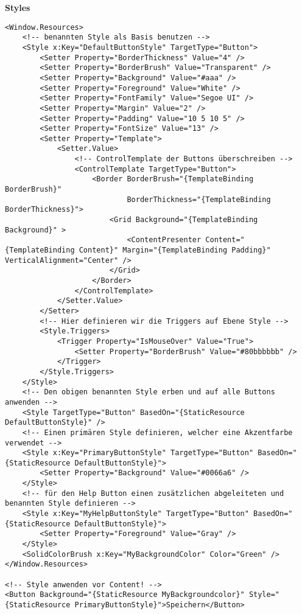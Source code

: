 \textbf{Styles}
\begin{lstlisting}
<Window.Resources>
	<!-- benannten Style als Basis benutzen -->
	<Style x:Key="DefaultButtonStyle" TargetType="Button">
		<Setter Property="BorderThickness" Value="4" />
		<Setter Property="BorderBrush" Value="Transparent" />
		<Setter Property="Background" Value="#aaa" />
		<Setter Property="Foreground" Value="White" />
		<Setter Property="FontFamily" Value="Segoe UI" />
		<Setter Property="Margin" Value="2" />
		<Setter Property="Padding" Value="10 5 10 5" />
		<Setter Property="FontSize" Value="13" />
		<Setter Property="Template">
			<Setter.Value>
				<!-- ControlTemplate der Buttons überschreiben -->
				<ControlTemplate TargetType="Button">
					<Border BorderBrush="{TemplateBinding BorderBrush}" 
							BorderThickness="{TemplateBinding BorderThickness}">
						<Grid Background="{TemplateBinding Background}" >
							<ContentPresenter Content="{TemplateBinding Content}" Margin="{TemplateBinding Padding}" VerticalAlignment="Center" />
						</Grid>
					</Border>
				</ControlTemplate>
			</Setter.Value>
		</Setter>
		<!-- Hier definieren wir die Triggers auf Ebene Style -->
		<Style.Triggers>
			<Trigger Property="IsMouseOver" Value="True">
				<Setter Property="BorderBrush" Value="#80bbbbbb" />
			</Trigger>
		</Style.Triggers>
	</Style>
	<!-- Den obigen benannten Style erben und auf alle Buttons anwenden -->
	<Style TargetType="Button" BasedOn="{StaticResource DefaultButtonStyle}" />
	<!-- Einen primären Style definieren, welcher eine Akzentfarbe verwendet -->
	<Style x:Key="PrimaryButtonStyle" TargetType="Button" BasedOn="{StaticResource DefaultButtonStyle}">
		<Setter Property="Background" Value="#0066a6" />
	</Style>
	<!-- für den Help Button einen zusätzlichen abgeleiteten und benannten Style definieren -->
	<Style x:Key="MyHelpButtonStyle" TargetType="Button" BasedOn="{StaticResource DefaultButtonStyle}">
		<Setter Property="Foreground" Value="Gray" />
	</Style>
	<SolidColorBrush x:Key="MyBackgroundColor" Color="Green" />
</Window.Resources>

<!-- Style anwenden vor Content! -->
<Button Background="{StaticResource MyBackgroundcolor}" Style="{StaticResource PrimaryButtonStyle}">Speichern</Button>
\end{lstlisting}